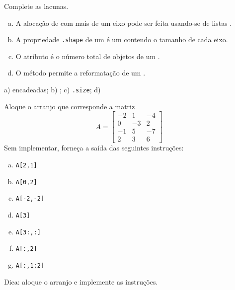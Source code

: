 
\begin{exer}
  Complete as lacunas.
  \begin{enumerate}[a)]
    \item A alocação de {\PYTHONnumpyDOTarray} com mais de um eixo pode ser feita usando-se de listas \underline{\phantom{encadeadas}}.
    \item A propriedade \texttt{.shape} de um {\PYTHONnumpyDOTarray} é um \underline{\phantom{\PYTHONtuple}} contendo o tamanho de cada eixo.
    \item O atributo \underline{} é o número total de objetos de um {\PYTHONnumpyDOTarray}.
    \item O método \underline{\phantom{\PYTHONnumpyDOTreshape}} permite a reformatação de um {\PYTHONnumpyDOTarray}.
  \end{enumerate}
\end{exer}
\begin{resp}
  a) encadeadas; b) {\PYTHONtuple}; c) \texttt{.size}; d) {\PYTHONnumpyDOTreshape}
\end{resp}


\begin{exer}
  Aloque o arranjo que corresponde a matriz
  \begin{equation}
    A =
    \begin{bmatrix}
      -2 & 1 & -4\\
      0  & -3 & 2\\
      -1 & 5 & -7\\
      2 & 3 & 6
    \end{bmatrix}
  \end{equation}
  Sem implementar, forneça a saída das seguintes instruções:
  \begin{enumerate}[a)]
  \item \lstinline+A[2,1]+
  \item \lstinline+A[0,2]+
  \item \lstinline+A[-2,-2]+
  \item \lstinline+A[3]+
  \item \lstinline+A[3:,:]+
  \item \lstinline+A[:,2]+
  \item \lstinline+A[:,1:2]+
  \end{enumerate}
\end{exer}
\begin{resp}
  Dica: aloque o arranjo e implemente as instruções.
\end{resp}

